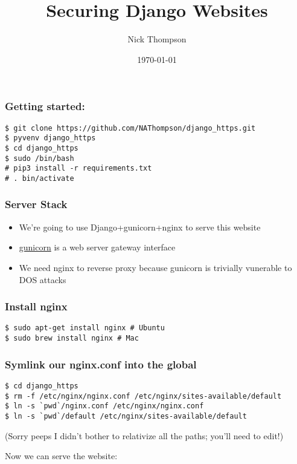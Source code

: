 \documentclass{beamer}
\begin{document}
\title{Securing Django Websites}
\author{Nick Thompson} 
\date{\today}

\frame{\titlepage}

\begin{frame}[fragile]
\frametitle{Getting started:}
\begin{verbatim}
$ git clone https://github.com/NAThompson/django_https.git
$ pyvenv django_https
$ cd django_https
$ sudo /bin/bash
# pip3 install -r requirements.txt
# . bin/activate
\end{verbatim}
\end{frame}

\begin{frame}
\frametitle{Server Stack}
\begin{itemize}
\item We're going to use Django+gunicorn+nginx to serve this website
\item \href{http://gunicorn.org/\#deployment}{gunicorn} is a web server gateway interface
\item We need nginx to reverse proxy because gunicorn is trivially vunerable to DOS attacks
\end{itemize}
\end{frame}

\begin{frame}[fragile]
\frametitle{Install nginx}
\begin{verbatim}
$ sudo apt-get install nginx # Ubuntu
$ sudo brew install nginx # Mac
\end{verbatim}
\end{frame}

\begin{frame}[fragile]
\frametitle{Symlink our nginx.conf into the global}
\begin{verbatim}
$ cd django_https
$ rm -f /etc/nginx/nginx.conf /etc/nginx/sites-available/default
$ ln -s `pwd`/nginx.conf /etc/nginx/nginx.conf
$ ln -s `pwd`/default /etc/nginx/sites-available/default
\end{verbatim}
(Sorry peeps I didn't bother to relativize all the paths; you'll need to edit!)
\end{frame}

\begin{frame}[fragile]
Now we can serve the website:
\end{frame}
\end{document}
